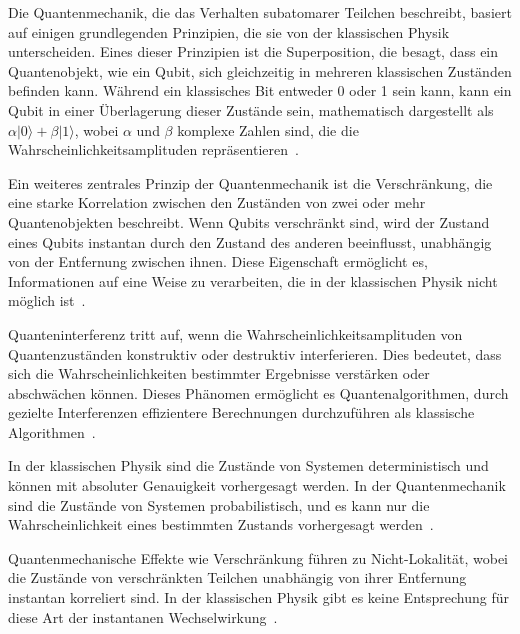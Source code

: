 Die Quantenmechanik, die das Verhalten subatomarer Teilchen beschreibt, basiert auf einigen grundlegenden Prinzipien, 
die sie von der klassischen Physik unterscheiden. Eines dieser Prinzipien ist die Superposition, die besagt, dass ein 
Quantenobjekt, wie ein Qubit, sich gleichzeitig in mehreren klassischen Zuständen befinden kann. Während ein klassisches Bit 
entweder 0 oder 1 sein kann, kann ein Qubit in einer Überlagerung dieser Zustände sein, mathematisch dargestellt 
als \( \alpha|0\rangle + \beta|1\rangle \), wobei \( \alpha \) und \( \beta \) komplexe Zahlen sind, die die 
Wahrscheinlichkeitsamplituden repräsentieren~\cite{nielsen2010quantum}.

Ein weiteres zentrales Prinzip der Quantenmechanik ist die Verschränkung, die eine starke Korrelation zwischen den 
Zuständen von zwei oder mehr Quantenobjekten beschreibt. Wenn Qubits verschränkt sind, wird der Zustand eines Qubits 
instantan durch den Zustand des anderen beeinflusst, unabhängig von der Entfernung zwischen ihnen. Diese Eigenschaft 
ermöglicht es, Informationen auf eine Weise zu verarbeiten, die in der klassischen Physik nicht möglich ist~\cite{einstein1935can}.

Quanteninterferenz tritt auf, wenn die Wahrscheinlichkeitsamplituden von Quantenzuständen konstruktiv oder 
destruktiv interferieren. Dies bedeutet, dass sich die Wahrscheinlichkeiten bestimmter Ergebnisse verstärken oder 
abschwächen können. Dieses Phänomen ermöglicht es Quantenalgorithmen, durch gezielte Interferenzen effizientere 
Berechnungen durchzuführen als klassische Algorithmen~\cite{feynman2018simulating}.

In der klassischen Physik sind die Zustände von Systemen deterministisch und können mit absoluter Genauigkeit 
vorhergesagt werden. In der Quantenmechanik sind die Zustände von Systemen probabilistisch, und es kann 
nur die Wahrscheinlichkeit eines bestimmten Zustands vorhergesagt werden~\cite{griffiths2018introduction}. 

Quantenmechanische Effekte wie Verschränkung führen zu Nicht-Lokalität, wobei die Zustände von verschränkten 
Teilchen unabhängig von ihrer Entfernung instantan korreliert sind. In der klassischen Physik gibt es keine 
Entsprechung für diese Art der instantanen Wechselwirkung~\cite{aspect1982experimental}. 


